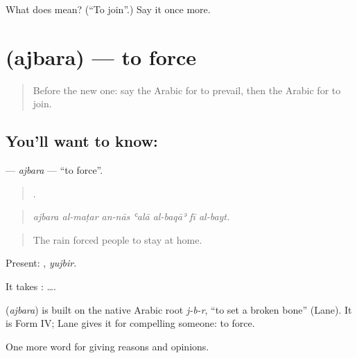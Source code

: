 \begin{tcolorbox}[breakable,colback=teal!4,colframe=teal!35!black,title={Before you move on}]
What does  mean? (\textquotedblleft{}To join\textquotedblright{}.) Say it once more.
\end{tcolorbox}
\section[\texorpdfstring{\ar{أجبر} (ajbara)}{أجبر (ajbara)}]{ (ajbara) — to force}

\label{lesson:AR-C389-ajbara}



\begin{quote}
Before the new one: say the Arabic for to prevail, then the Arabic for to join.
\end{quote}

\subsection*{You'll want to know: }
\textbf{} — \emph{ajbara} — \textquotedblleft{}to force\textquotedblright{}.

\begin{quote}
      .
\end{quote}

\begin{quote}
\emph{ajbara al-maṭar an-nās ʿalā al-baqāʾ fī al-bayt.}
\end{quote}

\begin{quote}
The rain forced people to stay at home.
\end{quote}

Present: , \emph{yujbir}.

It takes :   ….

\begin{cousinweb}
\textbf{} (\emph{ajbara}) is built on the native Arabic root \emph{j-b-r}, \textquotedblleft{}to set a broken bone\textquotedblright{} (Lane). It is Form IV; Lane gives it for compelling someone: to force.
\end{cousinweb}

\begin{grammarlens}[title={What you've built}]
One more word for giving reasons and opinions.
\end{grammarlens}

